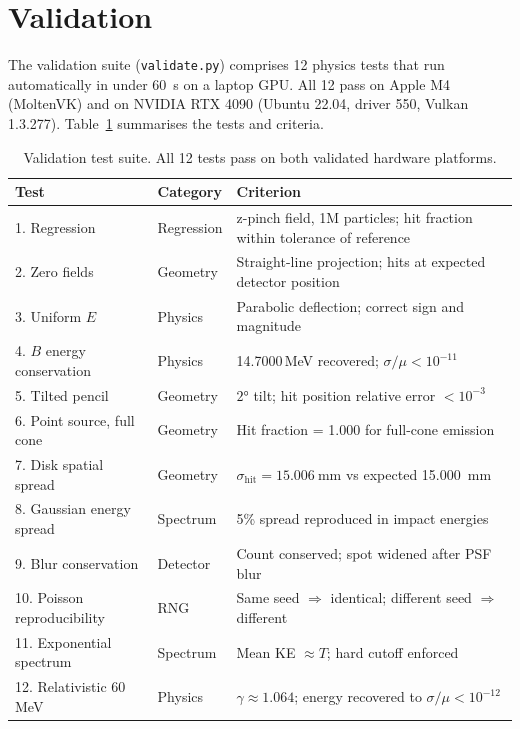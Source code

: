 \documentclass[review,12pt]{elsarticle}
\begin{document}
\section{Validation}
\label{sec:validation}

The validation suite (\texttt{validate.py}) comprises 12 physics tests that run
automatically in under \SI{60}{\second} on a laptop GPU. All 12 pass on Apple M4
(MoltenVK) and on NVIDIA RTX 4090 (Ubuntu 22.04, driver 550, Vulkan 1.3.277).
Table~\ref{tab:validation} summarises the tests and criteria.

\begin{table}[h!]
\centering
\caption{Validation test suite. All 12 tests pass on both validated hardware platforms.}
\label{tab:validation}
\begin{tabular}{llp{7cm}}
\toprule
Test & Category & Criterion \\
\midrule
1. Regression & Regression & z-pinch field, 1M particles; hit fraction within tolerance of reference \\
2. Zero fields & Geometry & Straight-line projection; hits at expected detector position \\
3. Uniform $E$ & Physics & Parabolic deflection; correct sign and magnitude \\
4. $B$ energy conservation & Physics & 14.7000\,MeV recovered; $\sigma/\mu < 10^{-11}$ \\
5. Tilted pencil & Geometry & $2°$ tilt; hit position relative error $< 10^{-3}$ \\
6. Point source, full cone & Geometry & Hit fraction = 1.000 for full-cone emission \\
7. Disk spatial spread & Geometry & $\sigma_\mathrm{hit} = \SI{15.006}{\mm}$ vs expected \SI{15.000}{\mm} \\
8. Gaussian energy spread & Spectrum & 5\% spread reproduced in impact energies \\
9. Blur conservation & Detector & Count conserved; spot widened after PSF blur \\
10. Poisson reproducibility & RNG & Same seed $\Rightarrow$ identical; different seed $\Rightarrow$ different \\
11. Exponential spectrum & Spectrum & Mean KE $\approx T$; hard cutoff enforced \\
12. Relativistic 60\,MeV & Physics & $\gamma \approx 1.064$; energy recovered to $\sigma/\mu < 10^{-12}$ \\
\bottomrule
\end{tabular}
\end{table}
\end{document}
